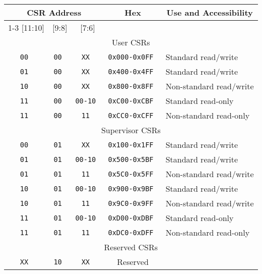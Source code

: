 \vspace{0.2in}
\begin{table*}[h!]
\begin{center}
\begin{tabular}{|c|c|c|c|l|}
\hline
\multicolumn{3}{|c|}{CSR Address} & Hex & \multicolumn{1}{c|}{Use and Accessibility}\\ \cline{1-3}
[11:10] & [9:8] & [7:6]                  &  & \\
\hline
\multicolumn{5}{|c|}{User CSRs}  \\
\hline
\tt   00   &\tt   00  &\tt   XX     & \tt 0x000-0x0FF & Standard read/write \\ 
\tt   01   &\tt   00  &\tt   XX     & \tt 0x400-0x4FF & Standard read/write \\ 
\tt   10   &\tt   00  &\tt   XX     & \tt 0x800-0x8FF & Non-standard read/write \\ 
\tt   11   &\tt   00  &\tt   00-10  & \tt 0xC00-0xCBF & Standard read-only \\
\tt   11   &\tt   00  &\tt   11     & \tt 0xCC0-0xCFF & Non-standard read-only \\
\hline
\multicolumn{5}{|c|}{Supervisor CSRs}  \\
\hline                                         
\tt   00   &\tt   01  &\tt   XX     & \tt 0x100-0x1FF & Standard read/write \\ 
\tt   01   &\tt   01  &\tt   00-10  & \tt 0x500-0x5BF & Standard read/write \\ 
\tt   01   &\tt   01  &\tt   11     & \tt 0x5C0-0x5FF & Non-standard read/write \\ 
\tt   10   &\tt   01  &\tt   00-10  & \tt 0x900-0x9BF & Standard read/write \\ 
\tt   10   &\tt   01  &\tt   11     & \tt 0x9C0-0x9FF & Non-standard read/write \\ 
\tt   11   &\tt   01  &\tt   00-10  & \tt 0xD00-0xDBF & Standard read-only \\
\tt   11   &\tt   01  &\tt   11     & \tt 0xDC0-0xDFF & Non-standard read-only \\
\hline
\multicolumn{5}{|c|}{Reserved CSRs} \\
\hline                                         
\tt   XX   &\tt   10  &\tt   XX     & Reserved & \\

\end{tabular}
\end{center}
\end{table*}
